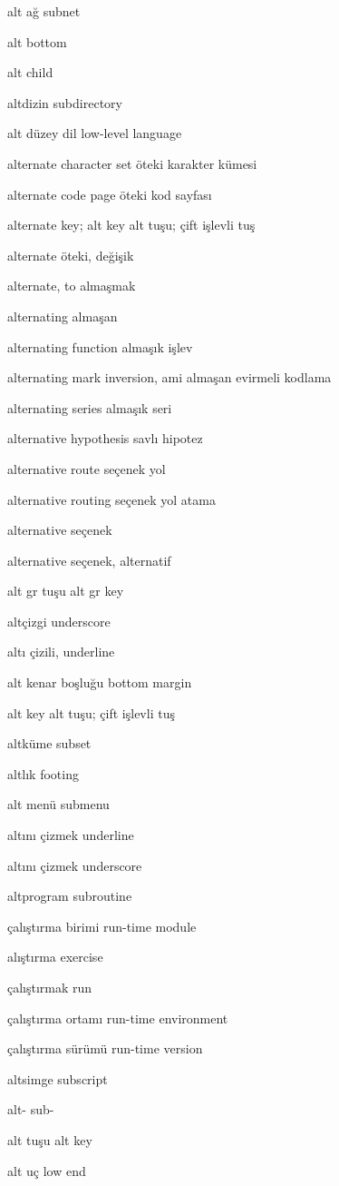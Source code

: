 \documentclass[12pt,fleqn]{article}\usepackage{../../common}
\begin{document}
alt ağ subnet

alt bottom

alt child

altdizin subdirectory

alt düzey dil low-level language

alternate character set öteki karakter kümesi

alternate code page öteki kod sayfası

alternate key; alt key alt tuşu; çift işlevli tuş

alternate öteki, değişik

alternate, to almaşmak

alternating almaşan

alternating function almaşık işlev

alternating mark inversion, ami almaşan evirmeli kodlama

alternating series almaşık seri

alternative hypothesis savlı hipotez

alternative route seçenek yol

alternative routing seçenek yol atama

alternative seçenek

alternative seçenek, alternatif

alt gr tuşu alt gr key

altçizgi underscore

altı çizili, underline

alt kenar boşluğu bottom margin

alt key alt tuşu; çift işlevli tuş

altküme subset

altlık footing

alt menü submenu

altını çizmek underline

altını çizmek underscore

altprogram subroutine

çalıştırma birimi run-time module

alıştırma exercise

çalıştırmak run

çalıştırma ortamı run-time environment

çalıştırma sürümü run-time version

altsimge subscript

alt- sub-

alt tuşu alt key

alt uç low end
\end{document}
